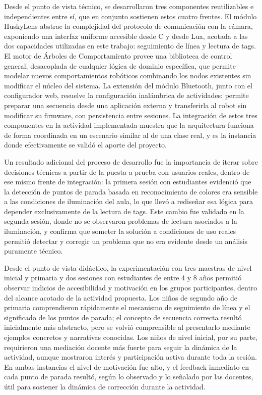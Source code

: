 \documentclass{prgrado}
\begin{document}
Desde el punto de vista técnico, se desarrollaron tres componentes reutilizables e independientes entre sí, que en conjunto sostienen estos cuatro frentes. El módulo HuskyLens abstrae la complejidad del protocolo de comunicación con la cámara, exponiendo una interfaz uniforme accesible desde C y desde Lua, acotada a las dos capacidades utilizadas en este trabajo: seguimiento de línea y lectura de tags. El motor de Árboles de Comportamiento provee una biblioteca de control general, desacoplada de cualquier lógica de dominio específica, que permite modelar nuevos comportamientos robóticos combinando los nodos existentes sin modificar el núcleo del sistema. La extensión del módulo Bluetooth, junto con el configurador web, resuelve la configuración inalámbrica de actividades: permite preparar una secuencia desde una aplicación externa y transferirla al robot sin modificar su firmware, con persistencia entre sesiones. La integración de estos tres componentes en la actividad implementada muestra que la arquitectura funciona de forma coordinada en un escenario similar al de una clase real, y es la instancia donde efectivamente se validó el aporte del proyecto.

Un resultado adicional del proceso de desarrollo fue la importancia de iterar sobre decisiones técnicas a partir de la puesta a prueba con usuarios reales, dentro de ese mismo frente de integración: la primera sesión con estudiantes evidenció que la detección de puntos de parada basada en reconocimiento de colores era sensible a las condiciones de iluminación del aula, lo que llevó a rediseñar esa lógica para depender exclusivamente de la lectura de tags. Este cambio fue validado en la segunda sesión, donde no se observaron problemas de lectura asociados a la iluminación, y confirma que someter la solución a condiciones de uso reales permitió detectar y corregir un problema que no era evidente desde un análisis puramente técnico.

Desde el punto de vista didáctico, la experimentación con tres maestras de nivel inicial y primaria y dos sesiones con estudiantes de entre 4 y 8 años permitió observar indicios de accesibilidad y motivación en los grupos participantes, dentro del alcance acotado de la actividad propuesta. Los niños de segundo año de primaria comprendieron rápidamente el mecanismo de seguimiento de línea y el significado de los puntos de parada; el concepto de secuencia correcta resultó inicialmente más abstracto, pero se volvió comprensible al presentarlo mediante ejemplos concretos y narrativas conocidas. Los niños de nivel inicial, por su parte, requirieron una mediación docente más fuerte para seguir la dinámica de la actividad, aunque mostraron interés y participación activa durante toda la sesión. En ambas instancias el nivel de motivación fue alto, y el feedback inmediato en cada punto de parada resultó, según lo observado y lo señalado por las docentes, útil para sostener la dinámica de corrección durante la actividad.
\end{document}
